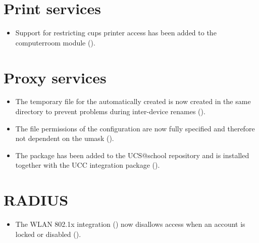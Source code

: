 %

\section{Print services}
\begin{itemize}
\item Support for restricting cups printer access has been added to the computerroom module ().
\end{itemize}

\section{Proxy services}
\begin{itemize}
\item The temporary file for the automatically created  is now created in the same directory to prevent problems during inter-device renames ().
\item The file permissions of the  configuration are now fully specified and therefore not dependent on the umask ().
\item The package  has been added to the
UCS@school repository and is installed together with the UCC integration
package  ().
\end{itemize}

\section{RADIUS}
\begin{itemize}
\item The WLAN 802.1x integration () now disallows access when an account is locked or disabled ().
\end{itemize}

%

